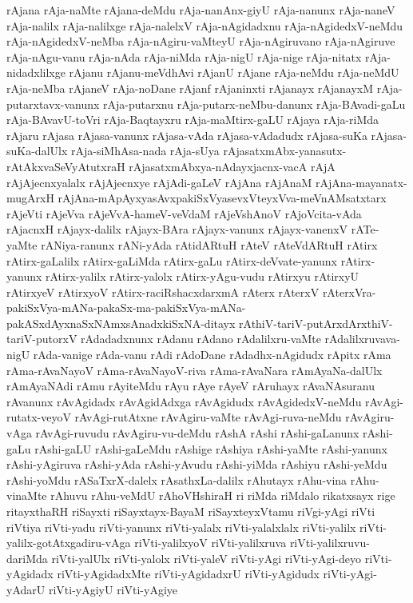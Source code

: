 {rAjana
rAja-naMte
rAjana-deMdu
rAja-nanAnx-giyU
rAja-nanunx
rAja-naneV
rAja-nalilx
rAja-nalilxge
rAja-nalelxV
rAja-nAgidadxnu
rAja-nAgidedxV-neMdu
rAja-nAgidedxV-neMba
rAja-nAgiru-vaMteyU
rAja-nAgiruvano
rAja-nAgiruve
rAja-nAgu-vanu
rAja-nAda
rAja-niMda
rAja-nigU
rAja-nige
rAja-nitatx
rAja-nidadxlilxge
rAjanu
rAjanu-meVdhAvi
rAjanU
rAjane
rAja-neMdu
rAja-neMdU
rAja-neMba
rAjaneV
rAja-noDane
rAjanf
rAjaninxti
rAjanayx
rAjanayxM
rAja-putarxtavx-vanunx
rAja-putarxnu
rAja-putarx-neMbu-danunx
rAja-BAvadi-gaLu
rAja-BAvavU-toVri
rAja-Baqtayxru
rAja-maMtirx-gaLU
rAjaya
rAja-riMda
rAjaru
rAjasa
rAjasa-vanunx
rAjasa-vAda
rAjasa-vAdadudx
rAjasa-suKa
rAjasa-suKa-dalUlx
rAja-siMhAsa-nada
rAja-sUya
rAjasatxmAbx-yanasutx-rAtAkxvaSeVyAtutxraH
rAjasatxmAbxya-nAdayxjacnx-vacA
rAjA
rAjAjecnxyalalx
rAjAjecnxye
rAjAdi-gaLeV
rAjAna
rAjAnaM
rAjAna-mayanatx-mugArxH
rAjAna-mApAyxyasAvxpakiSxVyasevxVteyxVva-meVnAMsatxtarx
rAjeVti
rAjeVva
rAjeVvA-hameV-veVdaM
rAjeVshAnoV
rAjoVcita-vAda
rAjacnxH
rAjayx-dalilx
rAjayx-BAra
rAjayx-vanunx
rAjayx-vanenxV
rATe-yaMte
rANiya-ranunx
rANi-yAda
rAtidARtuH
rAteV
rAteVdARtuH
rAtirx
rAtirx-gaLalilx
rAtirx-gaLiMda
rAtirx-gaLu
rAtirx-deVvate-yanunx
rAtirx-yanunx
rAtirx-yalilx
rAtirx-yalolx
rAtirx-yAgu-vudu
rAtirxyu
rAtirxyU
rAtirxyeV
rAtirxyoV
rAtirx-raciRshacxdarxmA
rAterx
rAterxV
rAterxVra-pakiSxVya-mANa-pakaSx-ma-pakiSxVya-mANa-pakASxdAyxnaSxNAmxsAnadxkiSxNA-ditayx
rAthiV-tariV-putArxdArxthiV-tariV-putorxV
rAdadadxnunx
rAdanu
rAdano
rAdalilxru-vaMte
rAdalilxruvava-nigU
rAda-vanige
rAda-vanu
rAdi
rAdoDane
rAdadhx-nAgidudx
rApitx
rAma
rAma-rAvaNayoV
rAma-rAvaNayoV-riva
rAma-rAvaNara
rAmAyaNa-dalUlx
rAmAyaNAdi
rAmu
rAyiteMdu
rAyu
rAye
rAyeV
rAruhayx
rAvaNAsuranu
rAvanunx
rAvAgidadx
rAvAgidAdxga
rAvAgidudx
rAvAgidedxV-neMdu
rAvAgi-rutatx-veyoV
rAvAgi-rutAtxne
rAvAgiru-vaMte
rAvAgi-ruva-neMdu
rAvAgiru-vAga
rAvAgi-ruvudu
rAvAgiru-vu-deMdu
rAshA
rAshi
rAshi-gaLanunx
rAshi-gaLu
rAshi-gaLU
rAshi-gaLeMdu
rAshige
rAshiya
rAshi-yaMte
rAshi-yanunx
rAshi-yAgiruva
rAshi-yAda
rAshi-yAvudu
rAshi-yiMda
rAshiyu
rAshi-yeMdu
rAshi-yoMdu
rASaTxrX-dalelx
rAsathxLa-dalilx
rAhutayx
rAhu-vina
rAhu-vinaMte
rAhuvu
rAhu-veMdU
rAhoVHshiraH
ri
riMda
riMdalo
rikatxsayx
rige
ritayxthaRH
riSayxti
riSayxtayx-BayaM
riSayxteyxVtamu
riVgi-yAgi
riVti
riVtiya
riVti-yadu
riVti-yanunx
riVti-yalalx
riVti-yalalxlalx
riVti-yalilx
riVti-yalilx-gotAtxgadiru-vAga
riVti-yalilxyoV
riVti-yalilxruva
riVti-yalilxruvu-dariMda
riVti-yalUlx
riVti-yalolx
riVti-yaleV
riVti-yAgi
riVti-yAgi-deyo
riVti-yAgidadx
riVti-yAgidadxMte
riVti-yAgidadxrU
riVti-yAgidudx
riVti-yAgi-yAdarU
riVti-yAgiyU
riVti-yAgiye
}
